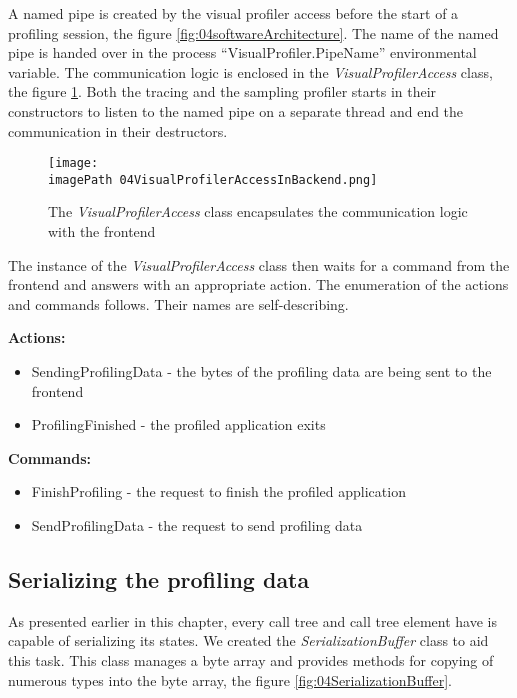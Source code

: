 A named pipe is created by the visual profiler access before the start of a profiling session, the figure \ref{fig:04softwareArchitecture}. The name of the named pipe is handed over in the process ``VisualProfiler.PipeName'' environmental variable. The communication logic is enclosed in the \textit{VisualProfilerAccess} class, the figure \ref{fig:04VisualProfilerAccessInBackend}. Both the tracing and the sampling profiler starts in their constructors to listen to the named pipe on a separate thread and end the communication in their destructors.

\begin{figure}
	\centering
		\texttt{[image: \\imagePath 04VisualProfilerAccessInBackend.png]}
		\caption{The \textit{VisualProfilerAccess} class encapsulates the communication logic with the frontend}
	\label{fig:04VisualProfilerAccessInBackend}
\end{figure}

The instance of the \textit{VisualProfilerAccess} class then waits for a command from the frontend and answers with an appropriate action. The enumeration of the actions and commands follows. Their names are self-describing.

\textbf{Actions:}
\begin{itemize}	
\item	SendingProfilingData - the bytes of the profiling data are being sent to the frontend
\item	ProfilingFinished - the profiled application exits
\end{itemize}

\textbf{Commands:}
\begin{itemize}	
\item	FinishProfiling - the request to finish the profiled application
\item	SendProfilingData - the request to send profiling data
\end{itemize}

\subsection{Serializing the profiling data}
As presented earlier in this chapter, every call tree and call tree element have is capable of serializing its states. We created the \textit{SerializationBuffer} class to aid this task. This class manages a byte array and provides methods for copying of numerous types into the byte array, the figure \ref{fig:04SerializationBuffer}.

